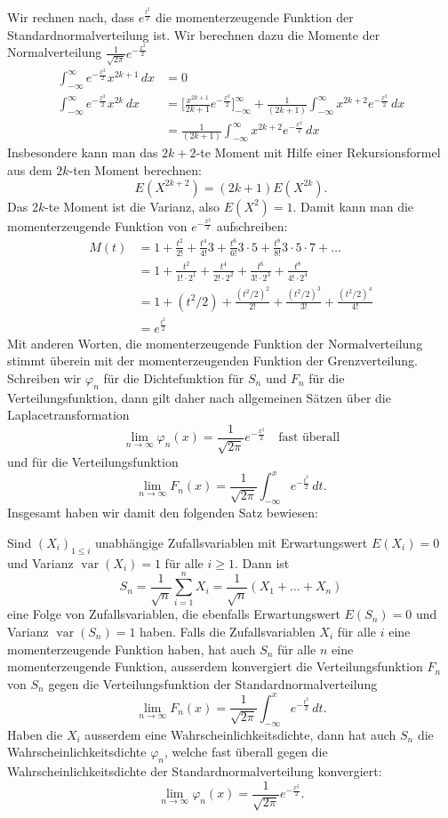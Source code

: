 Wir rechnen nach, dass $e^{\frac{t^2}2}$ die momenterzeugende Funktion
der Standardnormalverteilung ist.
Wir berechnen
dazu die Momente der Normalverteilung $\frac1{\sqrt{2\pi}}e^{-\frac{x^2}2}$
\begin{align*}
\int_{-\infty}^\infty e^{-\frac{x^2}2}x^{2k+1}\,dx&=0\\
\int_{-\infty}^\infty e^{-\frac{x^2}2}x^{2k}\,dx
&=
\biggl[\frac{x^{2k+1}}{2k+1}e^{-\frac{x^2}2}\biggr]_{-\infty}^\infty
+\frac1{(2k+1)}\int_{-\infty}^\infty x^{2k+2}e^{-\frac{x^2}2}\,dx\\
&=
\frac1{(2k+1)}\int_{-\infty}^\infty x^{2k+2}e^{-\frac{x^2}2}\,dx
\end{align*}
Insbesondere kann man das $2k+2$-te Moment mit Hilfe einer
Rekursionsformel aus dem $2k$-ten Moment berechnen:
\[
E(X^{2k+2})=(2k+1)E(X^{2k}).
\]
Das $2k$-te Moment ist die Varianz, also $E(X^2)=1$.
Damit kann
man die momenterzeugende Funktion von $e^{-\frac{x^2}2}$ aufschreiben:
\begin{align*}
M(t)
&=
1+\frac{t^2}{2!} +\frac{t^4}{4!}3 +\frac{t^6}{6!}3\cdot5 +\frac{t^8}{8!}3\cdot5\cdot7+\dots\\
&=
1+\frac{t^2}{1!\cdot 2^1} +\frac{t^4}{2! \cdot 2^2} +\frac{t^6}{3!\cdot 2^3}
+\frac{t^8}{4!\cdot 2^4}\\
&=
1+(t^2/2) +\frac{(t^2/2)^2}{2!} +\frac{(t^2/2)^3}{3!}
+\frac{(t^2/2)^4}{4!}\\
&=e^{\frac{t^2}2}
\end{align*}
Mit anderen Worten, die momenterzeugende Funktion der Normalverteilung
stimmt überein mit der momenterzeugenden Funktion der Grenzverteilung.
Schreiben wir $\varphi_n$ für die Dichtefunktion für $S_n$ und $F_n$
für die Verteilungsfunktion, dann gilt daher
nach allgemeinen Sätzen über die Laplacetransformation
\[
\lim_{n\to\infty}\varphi_n(x)=\frac1{\sqrt{2\pi}}e^{-\frac{x^2}2}
\quad\text{fast überall}
\]
und für die Verteilungsfunktion
\[
\lim_{n\to\infty}F_n(x)=\frac1{\sqrt{2\pi}}\int_{-\infty}^xe^{-\frac{t^2}2}\,dt.
\]
Insgesamt haben wir damit den folgenden Satz bewiesen:
\begin{satz}
\label{satz-zentraler-grenzwertsatz}
Sind $(X_i)_{1\le i}$ unabhängige Zufallsvariablen mit
Erwartungswert $E(X_i)=0$ und Varianz $\operatorname{var}(X_i)=1$
für alle $i\ge 1$.
Dann ist
\[
S_n=\frac1{\sqrt{n}}\sum_{i=1}^nX_i=\frac1{\sqrt{n}}(X_1+\dots+X_n)
\]
eine Folge von Zufallsvariablen, die ebenfalls Erwartungswert $E(S_n)=0$
und Varianz $\operatorname{var}(S_n)=1$ haben.
Falls die Zufallsvariablen
$X_i$
für alle $i$ eine momenterzeugende Funktion haben, hat auch $S_n$
für alle $n$ eine momenterzeugende Funktion, ausserdem konvergiert
die Verteilungsfunktion $F_n$ von $S_n$ gegen die Verteilungsfunktion der
Standardnormalverteilung
\[
\lim_{n\to\infty}F_n(x)=\frac1{\sqrt{2\pi}}\int_{-\infty}^xe^{-\frac{t^2}2}\,dt.
\]
Haben die $X_i$ ausserdem eine Wahrscheinlichkeitsdichte,
dann hat auch $S_n$
die Wahrscheinlichkeitsdichte $\varphi_n$, welche fast überall gegen die
Wahrscheinlichkeitsdichte der Standardnormalverteilung 
konvergiert:
\[
\lim_{n\to\infty}\varphi_n(x)=\frac1{\sqrt{2\pi}}e^{-\frac{x^2}2}.
\]
\end{satz}
